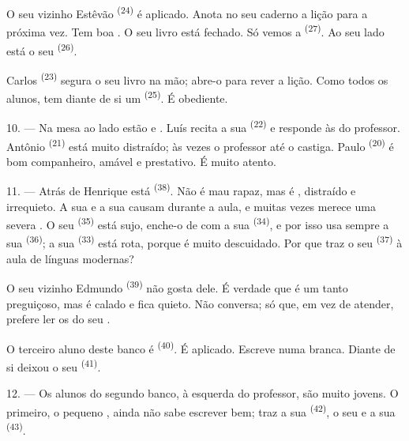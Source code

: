 O seu vizinho Estêvão \textsuperscript{(24)} é aplicado. Anota no seu caderno a
lição para a próxima vez. Tem boa . O seu livro está
fechado. Só vemos a  \textsuperscript{(27)}. Ao seu lado está o seu
 \textsuperscript{(26)}.

Carlos \textsuperscript{(23)} segura o seu livro na mão; abre-o para rever a
lição. Como todos os alunos, tem diante de si um 
\textsuperscript{(25)}. É obediente.

10. --- Na mesa ao lado estão  e . Luís
recita a sua  \textsuperscript{(22)} e responde às 
do professor. Antônio \textsuperscript{(21)} está muito distraído; às vezes o
professor até o castiga. Paulo \textsuperscript{(20)} é bom companheiro, amável
e prestativo. É muito atento.

\VUsaut{4.2mm}
\VUsaut{3.2mm}

11. --- Atrás de Henrique está  \textsuperscript{(38)}. Não é mau
rapaz, mas é , distraído e irrequieto. A sua
 e a sua  causam 
durante a aula, e muitas vezes merece uma severa . O
seu  \textsuperscript{(35)} está sujo, enche-o de
 com a sua  \textsuperscript{(34)}, e por
isso usa sempre a sua  \textsuperscript{(36)}; a sua
 \textsuperscript{(33)} está rota, porque é muito descuidado. Por
que traz o seu  \textsuperscript{(37)} à aula de línguas
modernas?

O seu vizinho Edmundo \textsuperscript{(39)} não gosta dele. É verdade que é um
tanto preguiçoso, mas é calado e fica quieto. Não conversa; só que, em
vez de atender, prefere ler os  do seu .

O terceiro aluno deste banco é  \textsuperscript{(40)}. É
aplicado. Escreve numa  branca. Diante de si
deixou o seu  \textsuperscript{(41)}.

12. --- Os alunos do segundo banco, à esquerda do professor, são muito
jovens. O primeiro, o pequeno , ainda não sabe escrever
bem; traz a sua  \textsuperscript{(42)}, o seu  e a sua  \textsuperscript{(43)}.

